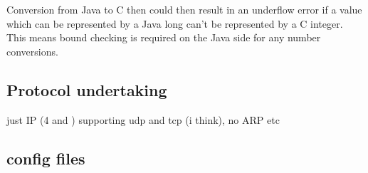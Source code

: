\documentclass[final_report.tex]{subfiles}
\begin{document}
Conversion from Java to C then could then result in an underflow error if a value which can be represented by a Java long can't be represented by a C integer. This means bound checking is required on the Java side for any number conversions.


\subsection{Protocol undertaking}

just IP (4 and ) supporting udp and tcp (i think), no ARP etc

\subsection{config files}
\end{document}
